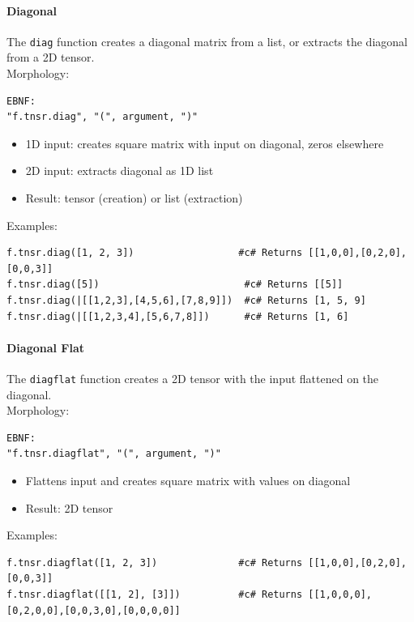\paragraph{Diagonal}
The \texttt{diag} function creates a diagonal matrix from a list, or extracts the diagonal from a 2D tensor.\\
Morphology:
\begin{verbatim}
EBNF:
"f.tnsr.diag", "(", argument, ")"
\end{verbatim}
\begin{itemize}
\item 1D input: creates square matrix with input on diagonal, zeros elsewhere
\item 2D input: extracts diagonal as 1D list
\item Result: tensor (creation) or list (extraction)
\end{itemize}
Examples:
\begin{verbatim}
f.tnsr.diag([1, 2, 3])                  #c# Returns [[1,0,0],[0,2,0],[0,0,3]]
f.tnsr.diag([5])                         #c# Returns [[5]]
f.tnsr.diag(|[[1,2,3],[4,5,6],[7,8,9]])  #c# Returns [1, 5, 9]
f.tnsr.diag(|[[1,2,3,4],[5,6,7,8]])      #c# Returns [1, 6]
\end{verbatim}

\paragraph{Diagonal Flat}
The \texttt{diagflat} function creates a 2D tensor with the input flattened on the diagonal.\\
Morphology:
\begin{verbatim}
EBNF:
"f.tnsr.diagflat", "(", argument, ")"
\end{verbatim}
\begin{itemize}
\item Flattens input and creates square matrix with values on diagonal
\item Result: 2D tensor
\end{itemize}
Examples:
\begin{verbatim}
f.tnsr.diagflat([1, 2, 3])              #c# Returns [[1,0,0],[0,2,0],[0,0,3]]
f.tnsr.diagflat([[1, 2], [3]])          #c# Returns [[1,0,0,0],[0,2,0,0],[0,0,3,0],[0,0,0,0]]
\end{verbatim}

